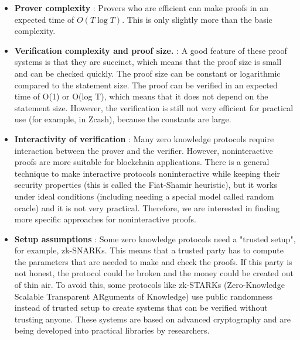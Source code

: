 \documentclass{report}
\begin{document}
\begin{itemize}
	\item \textbf{Prover complexity} : Provers who are efficient can make proofs in an expected time of $O(T \log T)$. This is only slightly more than the basic complexity.
	\item \textbf{Verification complexity and proof size.} : A good feature of these proof systems is that they are succinct, which means that the proof size is small and can be checked quickly. The proof size can be constant or logarithmic compared to the statement size. The proof can be verified in an expected time of O(1) or O(log T), which means that it does not depend on the statement size. However, the verification is still not very efficient for practical use (for example, in Zcash), because the constants are large.
	\item \textbf{Interactivity of verification} : Many zero knowledge protocols require interaction between the prover and the verifier. However, noninteractive proofs are more suitable for blockchain applications. There is a general technique to make interactive protocols noninteractive while keeping their security properties (this is called the Fiat-Shamir heuristic), but it works under ideal conditions (including needing a special model called random oracle) and it is not very practical. Therefore, we are interested in finding more specific approaches for noninteractive proofs.
	\item \textbf{Setup assumptions} : Some zero knowledge protocols need a "trusted setup", for example, zk-SNARKs. This means that a trusted party has to compute the parameters that are needed to make and check the proofs. If this party is not honest, the protocol could be broken and the money could be created out of thin air. To avoid this, some protocols like zk-STARKs (Zero-Knowledge Scalable Transparent ARguments of Knowledge) use public randomness instead of trusted setup to create systems that can be verified without trusting anyone. These systems are based on advanced cryptography and are being developed into practical libraries by researchers.
\end{itemize}
\end{document}
